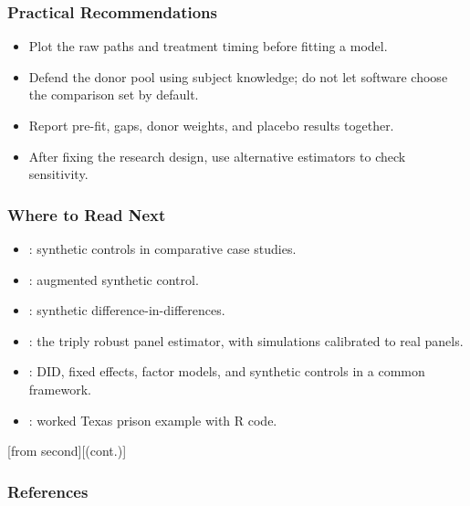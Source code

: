 \documentclass[xcolor=svgnames,9pt,english,t, aspectratio=169]{beamer}
\begin{document}
\begin{frame}
\frametitle{Practical Recommendations}

\begin{itemize}\itemsep1em
\item Plot the raw paths and treatment timing before fitting a model.\pause
\item Defend the donor pool using subject knowledge; do not let software choose the comparison set by default.\pause
\item Report pre-fit, gaps, donor weights, and placebo results together.\pause
\item After fixing the research design, use alternative estimators to check sensitivity.
\end{itemize}
\end{frame}

\begin{frame}
\frametitle{Where to Read Next}
\begin{itemize}\itemsep0.85em
\item \textcite{abadie2020using}: synthetic controls in comparative case studies.
\item \textcite{benmichael2021augmented}: augmented synthetic control.
\item \textcite{arkhangelsky2021synthetic}: synthetic difference-in-differences.
\item {}: the triply robust panel estimator, with simulations calibrated to real panels.
\item \textcite{arkhangelsky2024causal}: DID, fixed effects, factor models, and synthetic controls in a common framework.
\item \textcite{cunningham2021causal}: worked Texas prison example with R code.
\end{itemize}
\end{frame}

\appendix


[from second][(cont.)]
\begin{frame}[t,allowframebreaks=1.0]
  \frametitle{References}
\end{frame}
\end{document}
